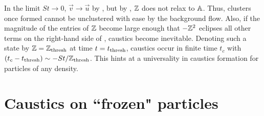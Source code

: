 \documentclass[../Rajarshi-thesis-draft.tex]{subfiles}
\begin{document}
In the limit $St \to 0$, $\vec{v} \to \vec{u}$ by ,  but by , $\mathbb{Z}$ does not relax to $\mathbb{A}$. Thus, clusters once formed cannot be unclustered with ease by the background flow. Also, if the magnitude of the entries of $\mathbb{Z}$ become large enough that $-\mathbb{Z}^2$ eclipses all other terms on the right-hand side of , caustics become inevitable. Denoting such a state by $\mathbb{Z} = \mathbb{Z}_{\rm thresh}$ at time $t=t_{\rm thresh}$, caustics occur in finite time {$t_c$ with $(t_c -t_{\rm thresh}) \sim -St/\mathbb{Z}_{\rm thresh}$}. This hints at a universality in caustics formation for particles of any density.

\section{Caustics on ``frozen" particles}
\label{int-sec:caus_cond}
\end{document}
